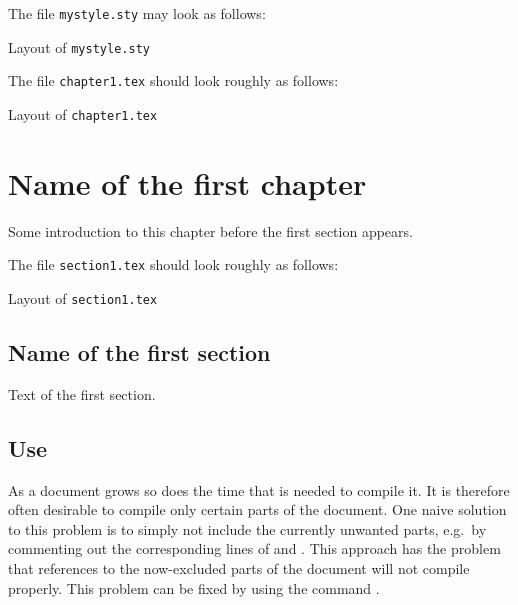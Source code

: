 %
The file \texttt{mystyle.sty} may look as follows:
%
\begin{showcode}{Layout of \texttt{mystyle.sty}}

\usepackage{mathtools}
\usepackage{amssymb}

\usepackage{tikz-cd}


\DeclareMathOperator{\End}{End}
\DeclareMathOperator{\Hom}{Hom}
\end{showcode}
%
The file \texttt{chapter1.tex} should look roughly as follows:
%
\begin{showcode}{Layout of \texttt{chapter1.tex}}
\chapter{Name of the first chapter}

Some introduction to this chapter before the first section appears.



\end{showcode}
%
The file \texttt{section1.tex} should look roughly as follows:
%
\begin{showcode}{Layout of \texttt{section1.tex}}
\section{Name of the first section}

Text of the first section.
\end{showcode}





\section{Use }

As a document grows so does the time that is needed to compile it.
It is therefore often desirable to compile only certain parts of the document.
One naive solution to this problem is to simply not include the currently unwanted parts, e.g.\ by commenting out the corresponding lines of  and .
This approach has the problem that references to the now-excluded parts of the document will not compile properly.
This problem can be fixed by using the command .

